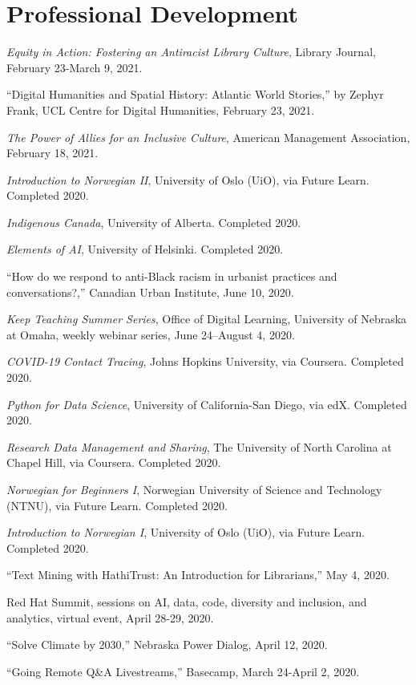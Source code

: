 \section{Professional Development}\label{professional-development}

\emph{Equity in Action: Fostering an Antiracist Library Culture},
Library Journal, February 23-March 9, 2021.

``Digital Humanities and Spatial History: Atlantic World Stories,'' by
Zephyr Frank, UCL Centre for Digital Humanities, February 23, 2021.

\emph{The Power of Allies for an Inclusive Culture}, American Management
Association, February 18, 2021.

\emph{Introduction to Norwegian II}, University of Oslo (UiO), via
Future Learn. Completed 2020.

\emph{Indigenous Canada}, University of Alberta. Completed 2020.

\emph{Elements of AI}, University of Helsinki. Completed 2020.

``How do we respond to anti-Black racism in urbanist practices and
conversations?,'' Canadian Urban Institute, June 10, 2020.

\emph{Keep Teaching Summer Series}, Office of Digital Learning,
University of Nebraska at Omaha, weekly webinar series, June 24--August
4, 2020.

\emph{COVID-19 Contact Tracing}, Johns Hopkins University, via Coursera.
Completed 2020.

\emph{Python for Data Science}, University of California-San Diego, via
edX. Completed 2020.

\emph{Research Data Management and Sharing}, The University of North
Carolina at Chapel Hill, via Coursera. Completed 2020.

\emph{Norwegian for Beginners I}, Norwegian University of Science and
Technology (NTNU), via Future Learn. Completed 2020.

\emph{Introduction to Norwegian I}, University of Oslo (UiO), via Future
Learn. Completed 2020.

``Text Mining with HathiTrust: An Introduction for Librarians,'' May 4,
2020.

Red Hat Summit, sessions on AI, data, code, diversity and inclusion, and
analytics, virtual event, April 28-29, 2020.

``Solve Climate by 2030,'' Nebraska Power Dialog, April 12, 2020.

``Going Remote Q\&A Livestreams,'' Basecamp, March 24-April 2, 2020.

